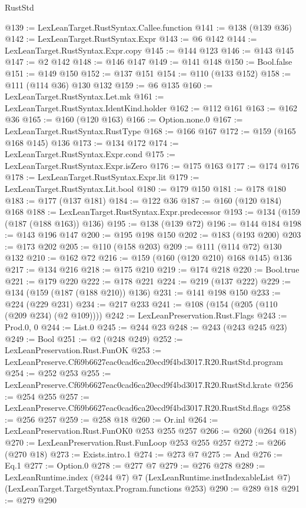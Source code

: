 \begin{lexlean}{RustStd}
\begin{coremodule}
@139 := LexLeanTarget.RustSyntax.Callee.function
@141 := @138 (@139 @36)
@142 := LexLeanTarget.RustSyntax.Expr
@143 := @6 @142
@144 := LexLeanTarget.RustSyntax.Expr.copy
@145 := @144 @123
@146 := @143 @145
@147 := @2 @142
@148 := @146 @147
@149 := @141 @148
@150 := Bool.false
@151 := @149 @150
@152 := @137 @151
@154 := @110 (@133 @152)
@158 := @111 (@114 @36) @130 @132
@159 := @6 @135
@160 := LexLeanTarget.RustSyntax.Let.mk
@161 := LexLeanTarget.RustSyntax.IdentKind.holder
@162 := @112 @161
@163 := @162 @36
@165 := @160 (@120 @163)
@166 := Option.none.{0}
@167 := LexLeanTarget.RustSyntax.RustType
@168 := @166 @167
@172 := @159 (@165 @168 @145) @136
@173 := @134 @172
@174 := LexLeanTarget.RustSyntax.Expr.cond
@175 := LexLeanTarget.RustSyntax.Expr.isZero
@176 := @175 @163
@177 := @174 @176
@178 := LexLeanTarget.RustSyntax.Expr.lit
@179 := LexLeanTarget.RustSyntax.Lit.bool
@180 := @179 @150
@181 := @178 @180
@183 := @177 (@137 @181)
@184 := @122 @36
@187 := @160 (@120 @184) @168
@188 := LexLeanTarget.RustSyntax.Expr.predecessor
@193 := @134 (@159 (@187 (@188 @163)) @136)
@195 := @138 (@139 @72)
@196 := @144 @184
@198 := @143 @196 @147
@200 := @195 @198 @150
@202 := @183 (@193 @200)
@203 := @173 @202
@205 := @110 (@158 @203)
@209 := @111 (@114 @72) @130 @132
@210 := @162 @72
@216 := @159 (@160 (@120 @210) @168 @145) @136
@217 := @134 @216
@218 := @175 @210
@219 := @174 @218
@220 := Bool.true
@221 := @179 @220
@222 := @178 @221
@224 := @219 (@137 @222)
@229 := @134 (@159 (@187 (@188 @210)) @136)
@231 := @141 @198 @150
@233 := @224 (@229 @231)
@234 := @217 @233
@241 := @108 (@154 (@205 (@110 (@209 @234) (@2 @109))))
@242 := LexLeanPreservation.Rust.Flags
@243 := Prod.{0, 0}
@244 := List.{0}
@245 := @244 @23
@248 := @243 (@243 @245 @23)
@249 := Bool
@251 := @2 (@248 @249)
@252 := LexLeanPreservation.Rust.FunOK
@253 := LexLeanPreserve.Cf69b6627eac0cad6ca20ecd9f4bd3017.R20.RustStd.program
@254 := @252 @253
@255 := LexLeanPreserve.Cf69b6627eac0cad6ca20ecd9f4bd3017.R20.RustStd.krate
@256 := @254 @255
@257 := LexLeanPreserve.Cf69b6627eac0cad6ca20ecd9f4bd3017.R20.RustStd.flags
@258 := @256 @257
@259 := @258 @18
@260 := Or.inl
@264 := LexLeanPreservation.Rust.FunOK0 @253 @255 @257
@266 := @260 (@264 @18)
@270 := LexLeanPreservation.Rust.FunLoop @253 @255 @257
@272 := @266 (@270 @18)
@273 := Exists.intro.{1}
@274 := @273 @7
@275 := And
@276 := Eq.{1}
@277 := Option.{0}
@278 := @277 @7
@279 := @276 @278
@289 := LexLeanRuntime.index
    (@244 @7)
    @7
    (LexLeanRuntime.instIndexableList @7)
    (LexLeanTarget.TargetSyntax.Program.functions @253)
@290 := @289 @18
@291 := @279 @290

\end{coremodule}
\end{lexlean}
